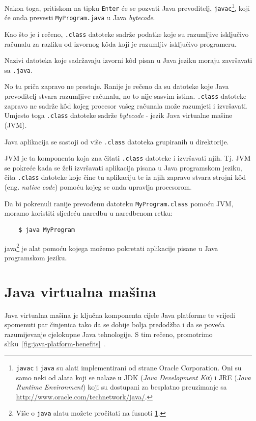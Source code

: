 Nakon toga, pritiskom na tipku \texttt{Enter} će se pozvati Java prevoditelj, \texttt{javac}\footnote{\label{ftn:javaandjavac}\texttt{javac} i \texttt{java} su alati implementirani od strane Oracle Corporation. Oni su samo neki od alata koji se nalaze u JDK (\emph{Java Development Kit}) i JRE (\emph{Java Runtime Environment}) koji su dostupani za besplatno preuzimanje sa \url{http://www.oracle.com/technetwork/java/}.}, koji će onda prevesti \texttt{MyProgram.java} u Java \emph{bytecode}.

Kao što je i rečeno, \texttt{.class} datoteke sadrže podatke koje su razumljive isključivo računalu za razliku od izvornog kôda koji je razumljiv isključivo programeru.

\begin{infobox}
    Nazivi datoteka koje sadržavaju izvorni kôd pisan u Java jeziku moraju završavati sa \texttt{.java}.
\end{infobox}

No tu priča zapravo ne prestaje. Ranije je rečeno da su datoteke koje Java prevoditelj stvara razumljive računalu, no to nije sasvim istina. \texttt{.class} datoteke zapravo ne sadrže kôd kojeg procesor vašeg računala može razumjeti i izvršavati. Umjesto toga \texttt{.class} datoteke sadrže \emph{bytecode} - jezik Java virtualne mašine (JVM).

\begin{infobox}
    Java aplikacija se sastoji od više \texttt{.class} datoteka grupiranih u direktorije.
\end{infobox}

JVM je ta komponenta koja zna čitati \texttt{.class} datoteke i izvršavati njih. Tj. JVM se pokreće kada se želi izvršavati aplikacija pisana u Java programskom jeziku, čita \texttt{.class} datoteke koje čine tu aplikaciju te iz njih zapravo stvara strojni kôd (eng. \emph{native code}) pomoću kojeg se onda upravlja procesorom.

Da bi pokrenuli ranije prevođenu datoteku \texttt{MyProgram.class} pomoću JVM, moramo koristiti sljedeću naredbu u naredbenom retku:

\begin{lstlisting}
    $ java MyProgram
\end{lstlisting}

java\footnote{Više o \texttt{java} alatu možete pročitati na fusnoti \ref{ftn:javaandjavac}.} je alat pomoću kojega možemo pokretati aplikacije pisane u Java programskom jeziku.

\section{Java virtualna mašina}
Java virtualna mašina je ključna komponenta cijele Java platforme te vrijedi spomenuti par činjenica tako da se dobije bolja predodžba i da se poveća razumijevanje cjelokupne Java tehnologije. S tim rečeno, promotrimo sliku~\ref{fig:java-platform-benefits}~\cite{javatutorials}.

